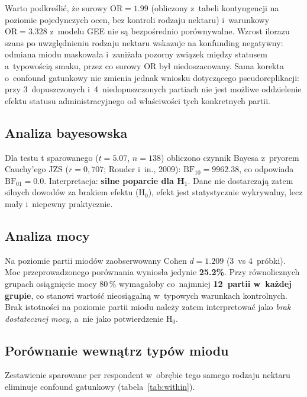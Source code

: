 Warto podkreślić, że surowy $\mathrm{OR} = 1.99$ (obliczony z~tabeli kontyngencji
na poziomie pojedynczych ocen, bez kontroli rodzaju nektaru) i~warunkowy
$\mathrm{OR} = 3.328$ z~modelu GEE nie są bezpośrednio porównywalne.
Wzrost ilorazu szans po uwzględnieniu rodzaju nektaru wskazuje na konfunding
negatywny: odmiana miodu maskowała i~zaniżała pozorny związek między statusem
a~typowością smaku, przez co surowy OR był niedoszacowany. Sama korekta
o~confound gatunkowy nie zmienia jednak wniosku dotyczącego pseudoreplikacji:
przy 3~dopuszczonych i~4~niedopuszczonych partiach
nie jest możliwe oddzielenie efektu statusu administracyjnego od właściwości
tych konkretnych partii.

\subsection{Analiza bayesowska}

Dla testu t sparowanego ($t = 5.07$, $n = 138$) obliczono
czynnik Bayesa z~pryorem Cauchy'ego JZS ($r = 0{,}707$;
Rouder i~in., 2009): $\mathrm{BF}_{10} = 9962.38$, co odpowiada
$\mathrm{BF}_{01} = 0.0$.
Interpretacja: \textbf{silne poparcie dla H$_1$}.
Dane nie dostarczają zatem silnych dowodów za brakiem efektu (H$_0$),
efekt jest statystycznie wykrywalny, lecz mały i~niepewny praktycznie.

\subsection{Analiza mocy}

Na poziomie partii miodów zaobserwowany Cohen $d = 1.209$
(3~vs 4~próbki).
Moc przeprowadzonego porównania wyniosła jedynie
\textbf{25.2\%}.
Przy równolicznych grupach osiągnięcie mocy 80\,\% wymagałoby
co~najmniej \textbf{12~partii w~każdej grupie},
co stanowi wartość nieosiągalną w~typowych warunkach kontrolnych.
Brak istotności na poziomie partii miodu należy zatem interpretować jako
\emph{brak dostatecznej mocy}, a~nie jako potwierdzenie H$_0$.

\subsection{Porównanie wewnątrz typów miodu}

Zestawienie sparowane per respondent w~obrębie tego samego rodzaju nektaru
eliminuje confound gatunkowy (tabela~\ref{tab:within}).

